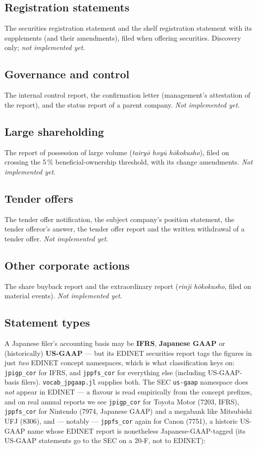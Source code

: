 \documentclass[11pt,a4paper]{report}
\begin{document}
\subsection{Registration statements}
The securities registration statement and the shelf registration statement with its supplements (and their
amendments), filed when offering securities. Discovery only; \emph{not implemented yet}.

\subsection{Governance and control}
The internal control report, the confirmation letter (management's attestation of the report), and the
status report of a parent company. \emph{Not implemented yet}.

\subsection{Large shareholding}
The report of possession of large volume (\emph{tairy\=o hoy\=u h\=okokusho}), filed on crossing the 5\,\%
beneficial-ownership threshold, with its change amendments. \emph{Not implemented yet}.

\subsection{Tender offers}
The tender offer notification, the subject company's position statement, the tender offeror's answer, the
tender offer report and the written withdrawal of a tender offer. \emph{Not implemented yet}.

\subsection{Other corporate actions}
The share buyback report and the extraordinary report (\emph{rinji h\=okokusho}, filed on material events).
\emph{Not implemented yet}.

\subsection{Statement types}

A Japanese filer's accounting basis may be \textbf{IFRS}, \textbf{Japanese GAAP} or (historically)
\textbf{US-GAAP} --- but its EDINET securities report tags the figures in just \emph{two} EDINET concept
namespaces, which is what classification keys on: \texttt{jpigp\_cor} for IFRS, and \texttt{jppfs\_cor} for
everything else (including US-GAAP-basis filers). \texttt{vocab\_jpgaap.jl} supplies both. The SEC
\texttt{us-gaap} namespace does \emph{not} appear in EDINET --- a flavour is read empirically from the
concept prefixes, and on real annual reports we see \texttt{jpigp\_cor} for Toyota Motor (7203, IFRS),
\texttt{jppfs\_cor} for Nintendo (7974, Japanese GAAP) and a megabank like Mitsubishi UFJ (8306), and
--- notably --- \texttt{jppfs\_cor} again for Canon (7751), a historic US-GAAP name whose EDINET report
is nonetheless Japanese-GAAP-tagged (its US-GAAP statements go to the SEC on a 20-F, not to EDINET):
\end{document}
